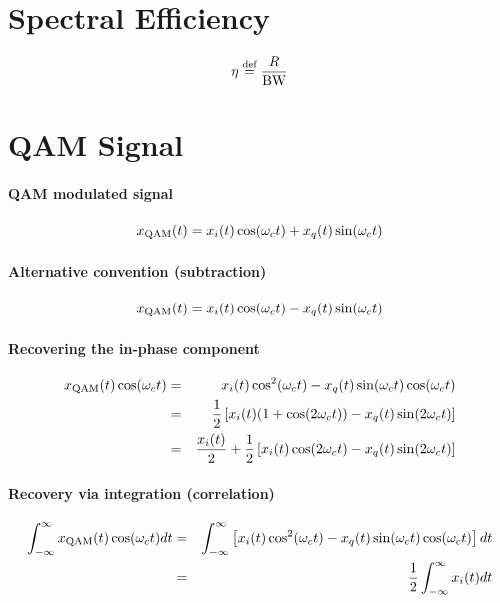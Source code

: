 \section*{Spectral Efficiency}
\begin{equation}
\eta \stackrel{\text{def}}{=} \frac {R} {{\textrm{BW}}}
\label{eq:spectral_efficiency}
\end{equation}

\section*{QAM Signal}

\paragraph{QAM modulated signal}
\begin{equation}
x_{\textrm{QAM}}(t) = x_i(t) \cos({\omega}_c t) + x_q(t) \sin({\omega}_c t)
\label{eq:qam}
\end{equation}

\paragraph{Alternative convention (subtraction)}
\begin{equation}
x_{\textrm{QAM}}(t) = x_i(t) \cos({\omega}_c t) - x_q(t) \sin({\omega}_c t)
\label{eq:qam2}
\end{equation}

\paragraph{Recovering the in-phase component}
\begin{eqnarray}
x_{\textrm{QAM}}(t) \cos({\omega}_c t) & = & x_i(t) \cos^2({\omega}_c t) - x_q(t) \sin({\omega}_c t)  \cos({\omega}_c t) \nonumber \\
& = & \frac{1}{2} \left[ x_i(t)(1+\cos(2{\omega}_c t)) - x_q(t) \sin(2{\omega}_c t) \right] \nonumber \\
& = & \frac{x_i(t)}{2} + \frac{1}{2} \left[ x_i(t)\cos(2{\omega}_c t) - x_q(t) \sin(2{\omega}_c t)\right]
\label{eq:qam_recovery}
\end{eqnarray}

\paragraph{Recovery via integration (correlation)}
\begin{eqnarray*}
\int_{-\infty}^\infty x_{\textrm{QAM}}(t) \cos({\omega}_c t) dt & = & \int_{-\infty}^\infty \left[ x_i(t) \cos^2({\omega}_c t) - x_q(t) \sin({\omega}_c t)  \cos({\omega}_c t) \right] dt\\
& = & \frac{1}{2} \int_{-\infty}^\infty x_{i}(t) dt
\end{eqnarray*}

